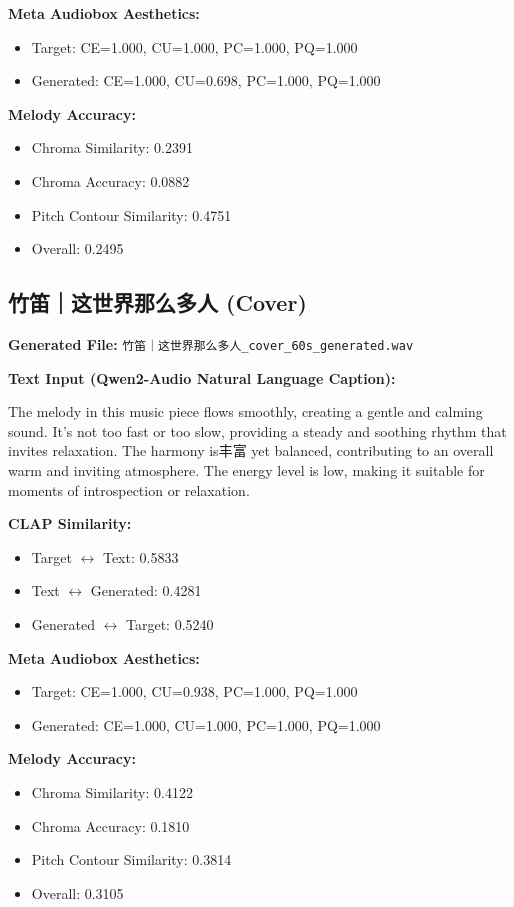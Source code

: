 \documentclass{article}
\begin{document}
\begin{CJK}{UTF8}{bsmi}
\textbf{Meta Audiobox Aesthetics:}
\begin{itemize}
    \item Target: CE=1.000, CU=1.000, PC=1.000, PQ=1.000
    \item Generated: CE=1.000, CU=0.698, PC=1.000, PQ=1.000
\end{itemize}

\textbf{Melody Accuracy:}
\begin{itemize}
    \item Chroma Similarity: 0.2391
    \item Chroma Accuracy: 0.0882
    \item Pitch Contour Similarity: 0.4751
    \item Overall: 0.2495
\end{itemize}

\subsection{竹笛｜这世界那么多人 (Cover)}

\textbf{Generated File:} \texttt{竹笛｜这世界那么多人\_cover\_60s\_generated.wav}

\textbf{Text Input (Qwen2-Audio Natural Language Caption):}

\small
The melody in this music piece flows smoothly, creating a gentle and calming sound. It's not too fast or too slow, providing a steady and soothing rhythm that invites relaxation. The harmony is丰富 yet balanced, contributing to an overall warm and inviting atmosphere. The energy level is low, making it suitable for moments of introspection or relaxation.
\normalsize

\textbf{CLAP Similarity:}
\begin{itemize}
    \item Target $\leftrightarrow$ Text: 0.5833
    \item Text $\leftrightarrow$ Generated: 0.4281
    \item Generated $\leftrightarrow$ Target: 0.5240
\end{itemize}

\textbf{Meta Audiobox Aesthetics:}
\begin{itemize}
    \item Target: CE=1.000, CU=0.938, PC=1.000, PQ=1.000
    \item Generated: CE=1.000, CU=1.000, PC=1.000, PQ=1.000
\end{itemize}

\textbf{Melody Accuracy:}
\begin{itemize}
    \item Chroma Similarity: 0.4122
    \item Chroma Accuracy: 0.1810
    \item Pitch Contour Similarity: 0.3814
    \item Overall: 0.3105
\end{itemize}


\end{CJK}
\end{document}

